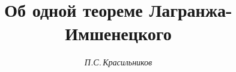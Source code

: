 















\newcommand{\rank}{\operatorname{rank}}


\newcommand{\codim}{\operatorname{codim}}


\newcommand{\tts}[1]{}










\setcounter{page}{34}












\author{\it П.С.\,Красильников}




\title{Об одной теореме Лагранжа-Имшенецкого}









\date{}







\pagestyle{plain} %








